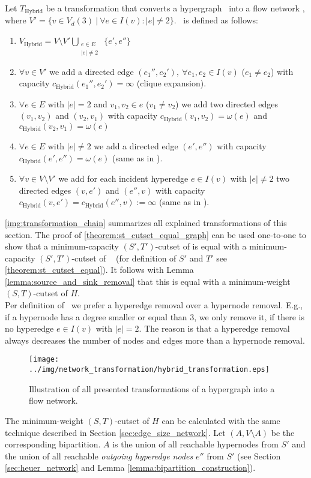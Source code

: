 \begin{definition}
Let $T_{\text{Hybrid}}$ be a transformation that converts a hypergraph \HypergraphDef~into 
a flow network \Hybrid, where $V' = \{v \in V_d(3)\ |\ \forall e \in I(v): |e| \neq 2\}$. 
\ShortHybrid~is defined as follows:
\begin{enumerate}
\item $V_{\text{Hybrid}} = V\setminus V' \bigcup\limits_{\substack{e \in E \\ |e| \neq 2}}\ \{e', e''\}$
\item $\forall v \in V'$ we add a directed edge $(e_1'', e_2'),\ \forall e_1, e_2 \in I(v)$ 
      ($e_1 \neq e_2$) with capacity $c_{\text{Hybrid}}(e_1'', e_2') = \infty$ (clique expansion).
\item $\forall e \in E$ with $|e| = 2$ and $v_1,v_2 \in e$ ($v_1 \neq v_2$) we add 
      two directed edges $(v_1,v_2)$ and $(v_2,v_1)$ with capacity $c_{\text{Hybrid}}(v_1,v_2) = \omega(e)$
      and $c_{\text{Hybrid}}(v_2,v_1) = \omega(e)$
\item $\forall e \in E$ with $|e| \neq 2$ we add a directed edge $(e',e'')$
      with capacity $c_{\text{Hybrid}}(e',e'') = \omega(e)$ (same as in ).
\item $\forall v \in V\setminus V'$ we add for each incident hyperedge $e \in I(v)$ with $|e| \neq 2$ 
      two directed edges $(v,e')$ and $(e'',v)$ with capacity 
      $c_{\text{Hybrid}}(v,e') = c_{\text{Hybrid}}(e'',v) := \infty$ (same as in ).
\end{enumerate} 
\end{definition}

\autoref{img:transformation_chain} summarizes all explained transformations of this section.
The proof of \autoref{theorem:st_cutset_equal_graph} can be used one-to-one to show that a minimum-capacity
$(S',T')$-cutset of  is equal with a minimum-capacity $(S',T')$-cutset of \ShortHybrid~
(for definition of $S'$ and $T'$ see \autoref{theorem:st_cutset_equal}). It follows with Lemma \ref{lemma:source_and_sink_removal}
that this is equal with a minimum-weight $(S,T)$-cutset of $H$. \\
Per definition of \ShortHybrid~we prefer a hyperedge removal over a hypernode removal. E.g., if
a hypernode has a degree smaller or equal than $3$, we only remove it, if there is no hyperedge
$e \in I(v)$ with $|e| = 2$. The reason is that a hyperedge removal always decreases the number of nodes
and edges more than a hypernode removal. \\
\begin{figure}[ht!]
\centering
\texttt{[image: ../img/network\_transformation/hybrid\_transformation.eps]}
\caption{Illustration of all presented transformations of a hypergraph into a flow network.}
\label{img:transformation_chain}
\end{figure}
The minimum-weight $(S,T)$-cutset of $H$ can be calculated with the same technique described in Section
\ref{sec:edge_size_network}. Let $(A,V\setminus A)$ be the corresponding bipartition.
$A$ is the union of all reachable hypernodes from $S'$ and the union of
all reachable \emph{outgoing hyperedge nodes} $e''$ from $S'$ (see Section \ref{sec:heuer_network} 
and Lemma \ref{lemma:bipartition_construction}). 
